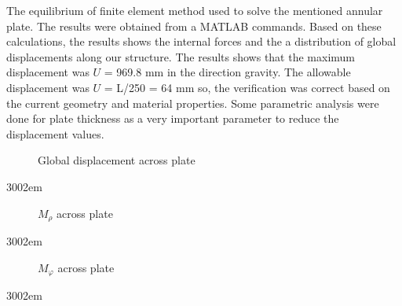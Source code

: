 The equilibrium of finite element method used to solve the mentioned annular
plate. The results were obtained from a MATLAB commands. Based on these
calculations, the results shows the internal forces and the a distribution of
global displacements along our structure. The results shows that the maximum
displacement was $U$ = 969.8 mm in the direction gravity. The allowable
displacement was $U$ = L/250 = 64 mm so, the verification was correct
based on the current geometry and material properties. Some parametric analysis
were done for plate thickness as a very important parameter to reduce the
displacement values.
\begin{figure}[H]
    \centering
        
\end{figure}
\begin{figure}[H]
    \centering
    
    \caption{ Global displacement across plate }
    \label{fig:UglobFull}
\end{figure}
\begin{xtolerant}{300}{2em}
    {\noindent \footnotesize }
  \end{xtolerant}
\begin{figure}[H]
    \centering
    
    \caption{ $M_{\rho}$ across plate }
    \label{fig:UglobFull}
\end{figure}
\begin{xtolerant}{300}{2em}
    {\noindent \footnotesize }
  \end{xtolerant}
\begin{figure}[H]
    \centering
    
    \caption{ $M_{\varphi}$ across plate }
    \label{fig:UglobFull}
\end{figure}
\begin{xtolerant}{300}{2em}
    {\noindent \footnotesize }    
  \end{xtolerant}